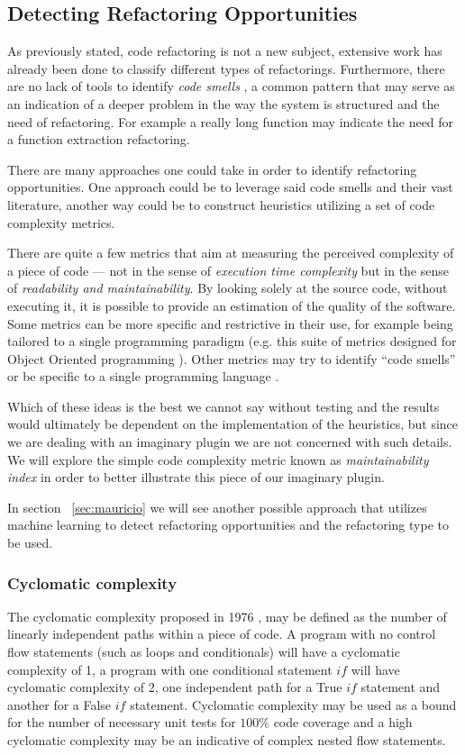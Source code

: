 \subsection{Detecting Refactoring Opportunities} 
\label{sec:code_metrics}

As previously stated, code refactoring is not a new subject, extensive work has already been done to classify different types of refactorings. Furthermore, there are no lack of tools \citep{bavote_smell,bavota_smell2,jdeodorant,dig_smells} to identify \textit{code smells} \citep{martinfowler}, a common pattern that may serve as an indication of a deeper problem in the way the system is structured and the need of refactoring. For example a really long function may indicate the need for a function extraction refactoring. 

There are many approaches one could take in order to identify refactoring opportunities. One approach could be to leverage said code smells and their vast literature, another way could be to construct heuristics utilizing a set of code complexity metrics.


There are quite a few metrics that aim at measuring the perceived complexity of a piece of code --- not in the sense of \textit{execution time complexity} but in the sense of \textit{readability and maintainability}. By looking solely at the source code, without executing it, it is possible to provide an estimation of the quality of the software. Some metrics can be more specific and restrictive in their use, for example being tailored to a single programming paradigm (e.g. this suite of metrics designed for Object Oriented programming \citep{OO_metrics}). Other metrics may try to identify ``code smells'' or be specific to a single programming language \citep{goreport}.


Which of these ideas is the best we cannot say without testing and the results would ultimately be dependent on the implementation of the heuristics, but since we are dealing with an imaginary plugin we are not concerned with such details. We will explore the simple code complexity metric known as \textit{maintainability index} in order to better illustrate this piece of our imaginary plugin.

In section ~\ref{sec:mauricio} we will see another possible approach that utilizes machine learning to detect refactoring opportunities and the refactoring type to be used.

\subsubsection{Cyclomatic complexity}
The cyclomatic complexity proposed in 1976 \citep{cyclomatic}, may be defined as the number of linearly independent paths within a piece of code. A program with no control flow statements (such as loops and conditionals) will have a cyclomatic complexity of 1, a program with one conditional statement $if$ will have cyclomatic complexity of 2, one independent path for a True $if$ statement and another for a False $if$ statement.
Cyclomatic complexity may be used as a bound for the number of necessary unit tests for $100\%$ code coverage and a high cyclomatic complexity may be an indicative of complex nested flow statements.


